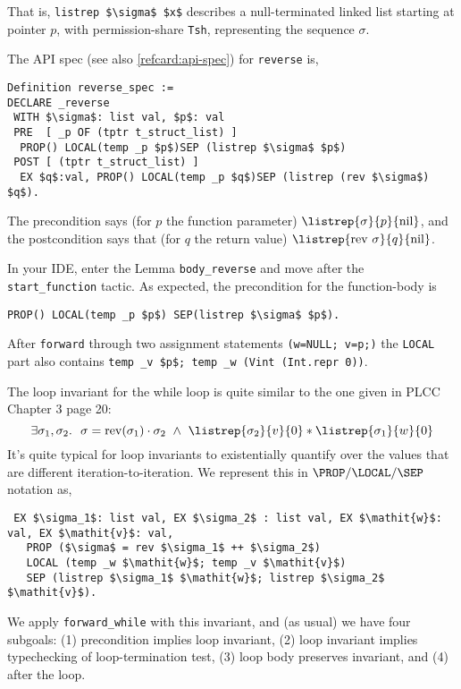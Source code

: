 \documentclass[12pt,fleqn,openany,oneside,showtrims]{memoir}
\begin{document}
That is, \lstinline{listrep $\sigma$ $x$}
describes a null-terminated linked list starting at pointer $p$,
with permission-share \lstinline{Tsh},
representing the sequence $\sigma$.

The API spec (see also \autoref{refcard:api-spec}) for \lstinline{reverse} is,
\begin{lstlisting}
Definition reverse_spec :=
DECLARE _reverse
 WITH $\sigma$: list val, $p$: val
 PRE  [ _p OF (tptr t_struct_list) ]
  PROP() LOCAL(temp _p $p$)SEP (listrep $\sigma$ $p$)
 POST [ (tptr t_struct_list) ]
  EX $q$:val, PROP() LOCAL(temp _p $q$)SEP (listrep (rev $\sigma$) $q$).
\end{lstlisting}
\vspace{-2ex}
The precondition says
(for $p$ the function parameter)
$\listrep{\sigma}{p}{\mathrm{nil}}$,
and the postcondition says
that (for $q$ the return value)
$\listrep{\mathrm{rev}~\sigma}{q}{\mathrm{nil}}$.

In your IDE, enter the Lemma \lstinline{body_reverse} and
move after the \lstinline{start_function} tactic.
As expected, the precondition for the function-body is
\begin{lstlisting}
PROP() LOCAL(temp _p $p$) SEP(listrep $\sigma$ $p$).
\end{lstlisting}
After \lstinline{forward} through two assignment statements
\lstinline{(w=NULL; v=p;)}
the \lstinline{LOCAL} part also contains
\lstinline{temp _v $p$; temp _w (Vint (Int.repr 0))}.

The loop invariant for the while loop is quite similar to the
one given in PLCC Chapter 3 page 20:
\[\exists \sigma_1,\sigma_2.
~~\sigma=\mathrm{rev}(\sigma_1)\cdot\sigma_2
~\wedge~
\listrep{\sigma_2}{v}{0}
*
\listrep{\sigma_1}{w}{0}
\]
It's
quite typical for loop invariants to existentially quantify
over the values that are different iteration-to-iteration.
We represent this in $\PROP/\LOCAL/\SEP$ notation as,
\begin{lstlisting}
 EX $\sigma_1$: list val, EX $\sigma_2$ : list val, EX $\mathit{w}$: val, EX $\mathit{v}$: val,
   PROP ($\sigma$ = rev $\sigma_1$ ++ $\sigma_2$)
   LOCAL (temp _w $\mathit{w}$; temp _v $\mathit{v}$)
   SEP (listrep $\sigma_1$ $\mathit{w}$; listrep $\sigma_2$ $\mathit{v}$).
\end{lstlisting}

We apply \lstinline{forward_while} with this invariant,
and (as usual) we have four subgoals:
(1) precondition implies loop invariant, (2) loop invariant
implies typechecking of loop-termination test,
(3) loop body preserves invariant, and (4) after the loop.
\end{document}
